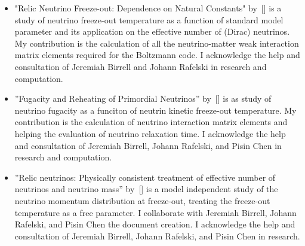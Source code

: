 \begin{itemize}
\item "Relic Neutrino Freeze-out: Dependence on Natural Constants" by~[\cite{Birrell:2014uka}] is a study of neutrino freeze-out temperature as a function of standard model parameter and its application on the effective number of (Dirac) neutrinos. My contribution is the calculation of all the neutrino-matter weak interaction matrix elements required for the Boltzmann code. I acknowledge the help and consultation of Jeremiah Birrell and Johann Rafelski in research and computation.

\item ''Fugacity and Reheating of Primordial Neutrinos'' by~[\cite{Birrell:2013gpa}] is as study of neutrino fugacity as a funciton of neutrin kinetic freeze-out temperature. My contribution is the calculation of neutrino interaction matrix  elements and helping the evaluation of  neutrino relaxation time. I acknowledge the help and consultation of Jeremiah Birrell, Johann Rafelski, and Pisin Chen in research and computation.

\item''Relic neutrinos: Physically consistent treatment of effective number of neutrinos and neutrino mass'' by~[\cite{Birrell:2012gg}] is a model independent study of the neutrino momentum distribution at freeze-out, treating the freeze-out temperature as a free parameter. I collaborate with Jeremiah Birrell, Johann Rafelski, and Pisin Chen the document creation. I acknowledge the help and consultation of Jeremiah Birrell, Johann Rafelski, and Pisin Chen in research. 

\end{itemize}